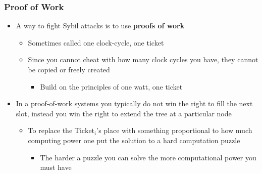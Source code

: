 \documentclass[11pt]{article}
\begin{document}
\subsubsection{Proof of Work}
\label{sec:orgfb8e6ac}
\begin{itemize}
\item A way to fight Sybil attacks is to use \textbf{proofs of work}
\begin{itemize}
\item Sometimes called one clock-cycle, one ticket
\item Since you cannot cheat with how many clock cycles you have, they cannot be copied or freely created
\begin{itemize}
\item Build on the principles of one watt, one ticket
\end{itemize}
\end{itemize}

\item In a proof-of-work systems you typically do not win the right to fill the next slot, instead you win the right to extend the tree at a particular node
\begin{itemize}
\item To replace the \(\text{Ticket}_i\)'s place with something proportional to how much computing power one put the solution to a hard computation puzzle
\begin{itemize}
\item The harder a puzzle you can solve the more computational power you must have
\end{itemize}
\end{itemize}


\end{itemize}
\end{document}

